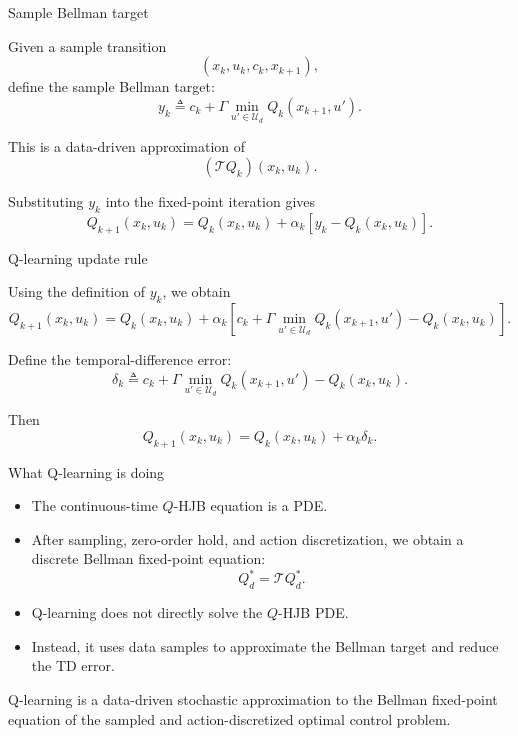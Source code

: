 \documentclass[aspectratio=169]{beamer}
\begin{document}
\begin{frame}{Sample Bellman target}

Given a sample transition
\[
(x_k,u_k,c_k,x_{k+1}),
\]
define the sample Bellman target:
\[
y_k
\triangleq
c_k
+
\Gamma
\min_{u'\in\mathcal U_d}
Q_k(x_{k+1},u').
\]

\vspace{0.2cm}

This is a data-driven approximation of
\[
(\mathcal TQ_k)(x_k,u_k).
\]

\vspace{0.2cm}

Substituting \(y_k\) into the fixed-point iteration gives
\[
Q_{k+1}(x_k,u_k)
=
Q_k(x_k,u_k)
+
\alpha_k
\left[
y_k-Q_k(x_k,u_k)
\right].
\]

\end{frame}


\begin{frame}{Q-learning update rule}

Using the definition of \(y_k\), we obtain
\[
Q_{k+1}(x_k,u_k)
=
Q_k(x_k,u_k)
+
\alpha_k
\left[
c_k
+
\Gamma
\min_{u'\in\mathcal U_d}
Q_k(x_{k+1},u')
-
Q_k(x_k,u_k)
\right].
\]

\vspace{0.15cm}

Define the temporal-difference error:
\[
\delta_k
\triangleq
c_k
+
\Gamma
\min_{u'\in\mathcal U_d}
Q_k(x_{k+1},u')
-
Q_k(x_k,u_k).
\]

Then
\[
Q_{k+1}(x_k,u_k)
=
Q_k(x_k,u_k)
+
\alpha_k\delta_k.
\]

\end{frame}


\begin{frame}{What Q-learning is doing}

\begin{itemize}
    \item The continuous-time \(Q\)-HJB equation is a PDE.


    \item After sampling, zero-order hold, and action discretization, we obtain a discrete Bellman fixed-point equation:
    \[
    Q_d^*=\mathcal TQ_d^*.
    \]


    \item Q-learning does not directly solve the \(Q\)-HJB PDE.


    \item Instead, it uses data samples to approximate the Bellman target and reduce the TD error.
\end{itemize}

\vspace{0.15cm}


Q-learning is a data-driven stochastic approximation to the Bellman fixed-point equation of the sampled and action-discretized optimal control problem.

\end{frame}
\end{document}
